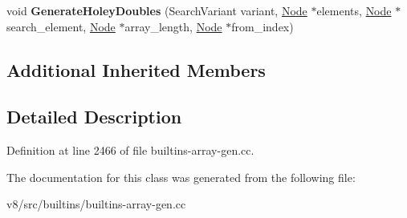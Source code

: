 \begin{DoxyCompactItemize}
\item 
\mbox{\label{classv8_1_1internal_1_1ArrayIncludesIndexofAssembler_abaca43c226e72cb9d094717ddd9eb9f7}} 
void {\bfseries Generate\+Holey\+Doubles} (Search\+Variant variant, \mbox{\hyperlink{classv8_1_1internal_1_1compiler_1_1Node}{Node}} $\ast$elements, \mbox{\hyperlink{classv8_1_1internal_1_1compiler_1_1Node}{Node}} $\ast$search\+\_\+element, \mbox{\hyperlink{classv8_1_1internal_1_1compiler_1_1Node}{Node}} $\ast$array\+\_\+length, \mbox{\hyperlink{classv8_1_1internal_1_1compiler_1_1Node}{Node}} $\ast$from\+\_\+index)
\end{DoxyCompactItemize}
\subsection*{Additional Inherited Members}


\subsection{Detailed Description}


Definition at line 2466 of file builtins-\/array-\/gen.\+cc.



The documentation for this class was generated from the following file\+:\begin{DoxyCompactItemize}
\item 
v8/src/builtins/builtins-\/array-\/gen.\+cc\end{DoxyCompactItemize}
